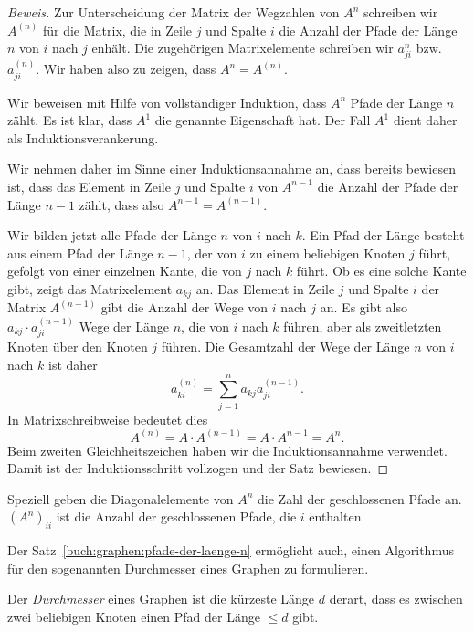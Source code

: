 \begin{proof}[Beweis]
Zur Unterscheidung der Matrix der Wegzahlen von $A^n$ schreiben wir
$A^{(n)}$ für die Matrix, die in Zeile
$j$ und Spalte $i$ die Anzahl der Pfade der Länge $n$ von $i$ nach $j$
enhält.
Die zugehörigen Matrixelemente schreiben wir $a_{ji}^{n}$ bzw.~$a_{ji}^{(n)}$.
Wir haben also zu zeigen, dass $A^n = A^{(n)}$.

Wir beweisen mit Hilfe von vollständiger Induktion,
dass $A^n$ Pfade der Länge $n$ zählt.
Es ist klar, dass $A^1$ die genannte Eigenschaft hat.
Der Fall $A^1$ dient daher als Induktionsverankerung.

Wir nehmen daher im Sinne einer Induktionsannahme an, dass bereits
bewiesen ist, dass das Element in Zeile
$j$ und Spalte $i$ von $A^{n-1}$ die Anzahl der Pfade der Länge $n-1$
zählt, dass also $A^{n-1}=A^{(n-1)}$.

Wir bilden jetzt alle Pfade der Länge $n$ von $i$ nach $k$.
Ein Pfad der Länge besteht aus einem Pfad der Länge $n-1$, der von $i$ zu
einem beliebigen Knoten $j$ führt, gefolgt von einer einzelnen Kante,
die von $j$ nach $k$ führt.
Ob es eine solche Kante gibt, zeigt das Matrixelement $a_{k\!j}$ an.
Das Element in Zeile $j$ und Spalte $i$ der Matrix $A^{(n-1)}$ gibt
die Anzahl der Wege von $i$ nach $j$ an.
Es gibt also $a_{k\!j}\cdot a_{ji}^{(n-1)}$ Wege der Länge $n$, die von $i$
nach $k$ führen, aber als zweitletzten Knoten über den Knoten $j$ führen.
Die Gesamtzahl der Wege der Länge $n$ von $i$ nach $k$ ist daher
\[
a_{ki}^{(n)}
=
\sum_{j=1}^n a_{k\!j} a_{ji}^{(n-1)}.
\]
In Matrixschreibweise bedeutet dies
\[
A^{(n)}
=
A\cdot A^{(n-1)}
=
A\cdot A^{n-1}
=
A^n.
\]
Beim zweiten Gleichheitszeichen haben wir die Induktionsannahme
verwendet.
Damit ist der Induktionsschritt vollzogen und der Satz bewiesen.
\end{proof}

Speziell geben die Diagonalelemente von $A^n$ die Zahl der geschlossenen
Pfade an.
$(A^n)_{ii}$ ist die Anzahl der geschlossenen Pfade, die $i$ enthalten.

Der Satz~\ref{buch:graphen:pfade-der-laenge-n} ermöglicht auch, einen 
Algorithmus für den sogenannten Durchmesser eines Graphen zu formulieren.

\begin{definition}
%
%
Der {\em Durchmesser} eines Graphen ist die kürzeste Länge $d$ derart, dass
es zwischen zwei beliebigen Knoten einen Pfad der Länge $\le d$ gibt.
\end{definition}

